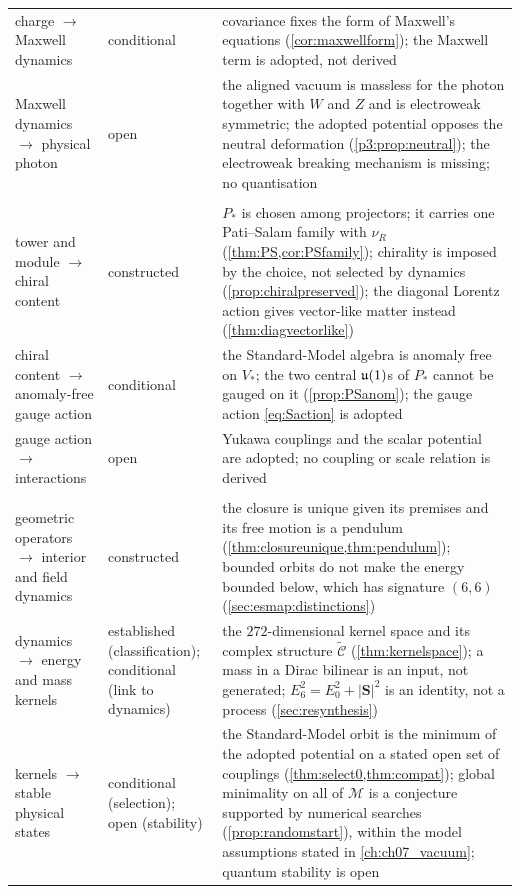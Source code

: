 {\begin{longtable}{@{}>{\raggedright\arraybackslash}p{3.3cm}>{\raggedright\arraybackslash}p{2.5cm}>{\raggedright\arraybackslash}p{8.9cm}@{}}
charge $\to$ Maxwell dynamics & conditional & covariance fixes the form of Maxwell's equations (\cref{cor:maxwellform}); the Maxwell term is adopted, not derived\\
Maxwell dynamics $\to$ physical photon & open & the aligned vacuum is massless for the photon together with $W$ and $Z$ and is electroweak symmetric; the adopted potential opposes the neutral deformation (\cref{p3:prop:neutral}); the electroweak breaking mechanism is missing; no quantisation\\
\addlinespace
\multicolumn{3}{@{}l}{\emph{Matter and interactions}}\\
tower and module $\to$ chiral content & constructed & $P_*$ is chosen among projectors; it carries one Pati--Salam family with $\nu_R$ (\cref{thm:PS,cor:PSfamily}); chirality is imposed by the choice, not selected by dynamics (\cref{prop:chiralpreserved}); the diagonal Lorentz action gives vector-like matter instead (\cref{thm:diagvectorlike})\\
chiral content $\to$ anomaly-free gauge action & conditional & the Standard-Model algebra is anomaly free on $V_*$; the two central $\mathfrak{u}(1)$s of $P_*$ cannot be gauged on it (\cref{prop:PSanom}); the gauge action \eqref{eq:Saction} is adopted\\
gauge action $\to$ interactions & open & Yukawa couplings and the scalar potential are adopted; no coupling or scale relation is derived\\
\addlinespace
\multicolumn{3}{@{}l}{\emph{Energy and mass}}\\
geometric operators $\to$ interior and field dynamics & constructed & the closure is unique given its premises and its free motion is a pendulum (\cref{thm:closureunique,thm:pendulum}); bounded orbits do not make the energy bounded below, which has signature $(6,6)$ (\cref{sec:esmap:distinctions})\\
dynamics $\to$ energy and mass kernels & established (classification); conditional (link to dynamics) & the $272$-dimensional kernel space and its complex structure $\widetilde{\mathcal C}$ (\cref{thm:kernelspace}); a mass in a Dirac bilinear is an input, not generated; $E_6^2=E_0^2+|\mathbf S|^2$ is an identity, not a process (\cref{sec:resynthesis})\\
kernels $\to$ stable physical states & conditional (selection); open (stability) & the Standard-Model orbit is the minimum of the adopted potential on a stated open set of couplings (\cref{thm:select0,thm:compat}); global minimality on all of $\mathcal M$ is a conjecture supported by numerical searches (\cref{prop:randomstart}), within the model assumptions stated in \cref{ch:ch07_vacuum}; quantum stability is open\\

\end{longtable}}
